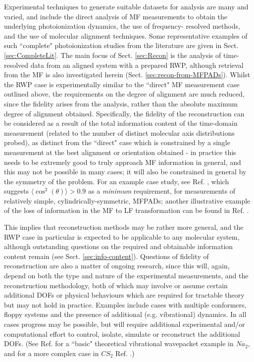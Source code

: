 \documentclass[10pt]{article}
\begin{document}
Experimental techniques to generate suitable datasets for analysis are many and varied, and include the direct analysis of MF measurements to obtain the underlying photoionization dynamics, the use of frequency- resolved methods, and the use of molecular alignment techniques. Some representative examples of such ``complete" photoionization studies from the literature are given in Sect. \ref{sec:CompleteLit}. %
The main focus of Sect. \ref{sec:Recon} is the analysis of time-resolved data from an aligned system with a prepared RWP, although retrieval from the MF is also investigated herein (Sect. \ref{sec:recon-from-MFPADs}). Whilst the RWP case is experimentally similar to the ``direct" MF measurement case outlined above, the requirements on the degree of alignment are much reduced, since the fidelity arises from the analysis, rather than the absolute maximum degree of alignment obtained. Specifically, the fidelity of the reconstruction can be considered as a result of the total information content of the time-domain measurement (related to the number of distinct molecular axis distributions probed), as distinct from the ``direct" case which is constrained by a single measurement at the best alignment or orientation obtained - in practice this needs to be extremely good to truly approach MF information in general, and this may not be possible in many cases; it will also be constrained in general by the symmetry of the problem. For an example case study, see Ref. \cite{reid2018AccessingMolecularFramea}, which suggests $\langle\cos^2(\theta)\rangle>0.9$ as a \textit{minimum} requirement, for measurements of relatively simple, cylindrically-symmetric, MFPADs; another illustrative example of the loss of information in the MF to LF transformation can be found in Ref. \cite{Underwood2000}.

This implies that reconstruction methods may be rather more general, and the RWP case in particular is expected to be applicable to any molecular system, although outstanding questions on the required and obtainable information content remain (see Sect. \ref{sec:info-content}). Questions of fidelity of reconstruction are also a matter of ongoing research, since this will, again, depend on both the type and nature of the experimental measurements, and the reconstruction methodology, both of which may involve or assume certain additional DOFs or physical behaviours which are required for tractable theory but may not hold in practice. Examples include cases with multiple conformers, floppy systems and the presence of additional (e.g. vibrational) dynamics. In all cases progress may be possible, but will require additional experimental and/or computational effort to control, isolate, simulate or reconstruct the additional DOFs. (See Ref. \cite{Takatsuka2000} for a ``basic" theoretical vibrational wavepacket example in $Na_2$, and for a more complex case in $CS_2$ Ref. \cite{wang2017MonitoringNonadiabaticDynamics}.)
\end{document}

